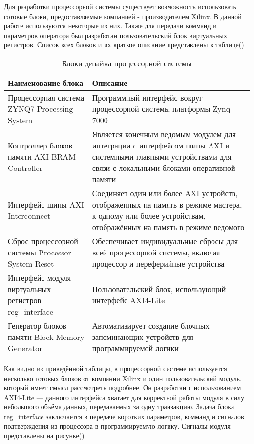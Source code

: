Для разработки процессорной системы существует возможность использовать готовые блоки, предоставляемые компанией - производителем Xilinx. В данной работе используются некоторые из них. Также для передачи комманд и параметров оператора был разработан пользовательский блок виртуальных регистров. Список всех блоков и их краткое описание представлены в таблице()\par
\begin{table}
    \caption{Блоки дизайна процессорной системы}
    \begin{tabular}{|p{}|p{}|}
        \hline
        Наименование блока & Описание \\
        \hline
        Процессорная система ZYNQ7 Processing System & Программный интерфейс вокруг процессорной системы платформы Zynq-7000 \\
        \hline
        Контроллер блоков памяти AXI BRAM Controller & Является конечным ведомым модулем для интеграции с интерфейсом шины AXI и системными главными устройствами для связи с локальными блоками оперативной памяти \\
        \hline
        Интерфейс шины AXI Interconnect & Соединяет один или более AXI устройств, отображенных на память в режиме мастера, к одному или более устройствам, отображённых на память в режиме ведомого \\
        \hline
        Сброс процессорной системы Processor System Reset & Обеспечивает индивидуальные сбросы для всей процессорной системы, включая процессор и переферийные устройства \\
        \hline
        Интерфейс модуля виртуальных регистров reg\_interface & Пользовательский блок, использующий интерфейс AXI4-Lite \\
        \hline
        Генератор блоков памяти Block Memory Generator & Автоматизирует создание блочных запоминающих устройств для программируемой логики\\
        \hline
    \end{tabular}
\end{table}
Как видно из приведённой таблицы, в процессорной системе используется несколько готовых блоков от компании Xilinx и один пользовательский модуль, который имеет смысл рассмотреть подробнее. Он разработан с использованием AXI4-Lite --- данного интерфейса хватает для корректной работы модуля в силу небольшого объёма данных, передаваемых за одну транзакцию. Задача блока reg\_interface заключается в передаче коротких параметров, комманд и сигналов подтверждения из процессора в программируемую логику. Сигналы модуля представлены на рисунке().\par 
